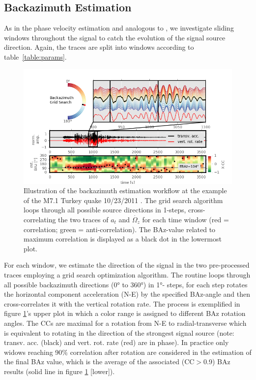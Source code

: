 \documentclass[12pt,reqno,letter]{article} %
\begin{document}
\subsection{Backazimuth Estimation}
As in the phase velocity estimation and analogous to \cite{Igel2007}, we investigate sliding windows throughout the signal to catch the evolution of the signal source direction.  Again, the traces are split into windows according to table~\ref{table:params}.\\
%
\begin{figure}[!htp]
\centering
\includegraphics[width=\textwidth]{pp_Baz_paperready.png}
\caption{Illustration of the backazimuth estimation workflow at the example of the M7.1 Turkey quake 10/23/2011 . The grid search algorithm loops through all possible source directions in 1\textdegree -steps, cross-correlating the two traces of $a_t$ and $\dot{\Omega_z}$ for each time window (red = correlation; green = anti-correlation). The BAz-value related to maximum correlation is displayed as a black dot in the lowermost plot.}
\label{fig:baz}
\end{figure}
%
For each window, we estimate the direction of the signal in the two pre-processed traces employing a grid search optimization algorithm. The routine loops through all possible backazimuth directions (0° to 360°) in 1°- steps, for each step rotates the horizontal component acceleration (N-E) by the specified BAz-angle and then cross-correlates it with the vertical rotation rate. The process is exemplified in figure \ref{fig:baz}'s upper plot in which a color range is assigned to different BAz rotation angles.  The CCs are maximal for a rotation from N-E to radial-transverse which is equivalent to rotating in the direction of the strongest signal source (note: transv. acc. (black) and vert. rot. rate (red) are in phase). In practice only widows reaching 90\% correlation after rotation are considered in the estimation of the final BAz value, which is the average of the associated (CC$>$0.9) BAz results (solid line in figure \ref{fig:baz} [lower]). 
\end{document}
